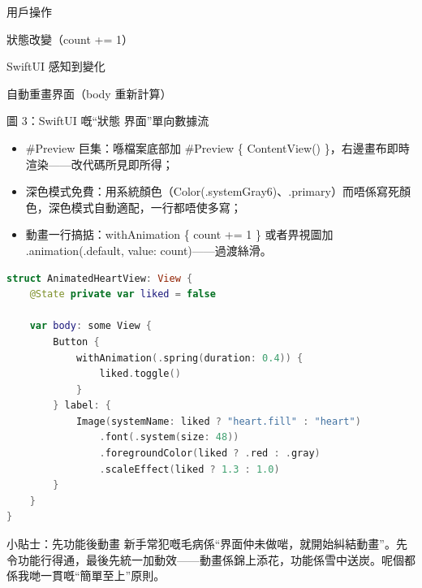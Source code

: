 用戶操作

狀態改變（count += 1）

SwiftUI 感知到變化

自動重畫界面（body 重新計算）

\begin{center}\small\color{gray}圖 3：SwiftUI 嘅“狀態 界面”單向數據流\end{center}


\begin{itemize}
  \item \#Preview 巨集：喺檔案底部加 \#Preview \{ ContentView() \}，右邊畫布即時渲染——改代碼所見即所得；
  \item 深色模式免費：用系統顏色（Color(.systemGray6)、.primary）而唔係寫死顏色，深色模式自動適配，一行都唔使多寫；
  \item 動畫一行搞掂：withAnimation \{ count += 1 \} 或者畀視圖加 .animation(.default, value: count)——過渡絲滑。
\end{itemize}

\begin{lstlisting}[language=Swift]
struct AnimatedHeartView: View {
    @State private var liked = false

    var body: some View {
        Button {
            withAnimation(.spring(duration: 0.4)) {
                liked.toggle()
            }
        } label: {
            Image(systemName: liked ? "heart.fill" : "heart")
                .font(.system(size: 48))
                .foregroundColor(liked ? .red : .gray)
                .scaleEffect(liked ? 1.3 : 1.0)
        }
    }
}
\end{lstlisting}

\begin{tcbinfo}{小貼士：先功能後動畫}
新手常犯嘅毛病係“界面仲未做啱，就開始糾結動畫”。先令功能行得通，最後先統一加動效——動畫係錦上添花，功能係雪中送炭。呢個都係我哋一貫嘅“簡單至上”原則。

\end{tcbinfo}

